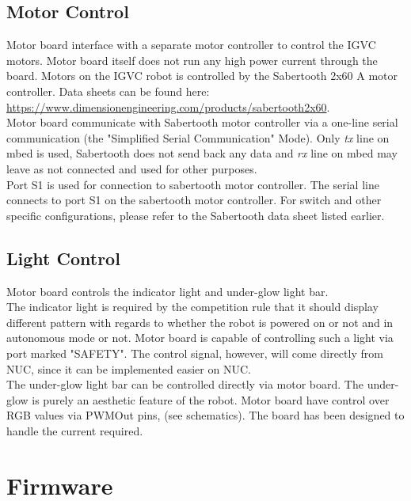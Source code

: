 \documentclass[letterpaper, 12pt]{article}
\begin{document}
\subsection{Motor Control}
Motor board interface with a separate motor controller to control the IGVC motors. Motor board itself does not run any high power current through the board. Motors on the IGVC robot is controlled by the Sabertooth 2x60 A motor controller. Data sheets can be found here: \url{https://www.dimensionengineering.com/products/sabertooth2x60}.\\

Motor board communicate with Sabertooth motor controller via a one-line serial communication (the "Simplified Serial Communication" Mode). Only \emph{tx} line on mbed is used, Sabertooth does not send back any data and \emph{rx} line on mbed may leave as not connected and used for other purposes.\\

Port S1 is used for connection to sabertooth motor controller. The serial line connects to port S1 on the sabertooth motor controller. For switch and other specific configurations, please refer to the Sabertooth data sheet listed earlier. \\

\subsection{Light Control}
Motor board controls the indicator light and under-glow light bar.\\

The indicator light is required by the competition rule that it should display different pattern with regards to whether the robot is powered on or not and in autonomous mode or not. Motor board is capable of controlling such a light via port marked "SAFETY". The control signal, however, will come directly from NUC, since it can be implemented easier on NUC.\\

The under-glow light bar can be controlled directly via motor board. The under-glow is purely an aesthetic feature of the robot. Motor board have control over RGB values via PWMOut pins, (see schematics). The board has been designed to handle the current required.

\pagebreak

\section{Firmware}
\end{document}
